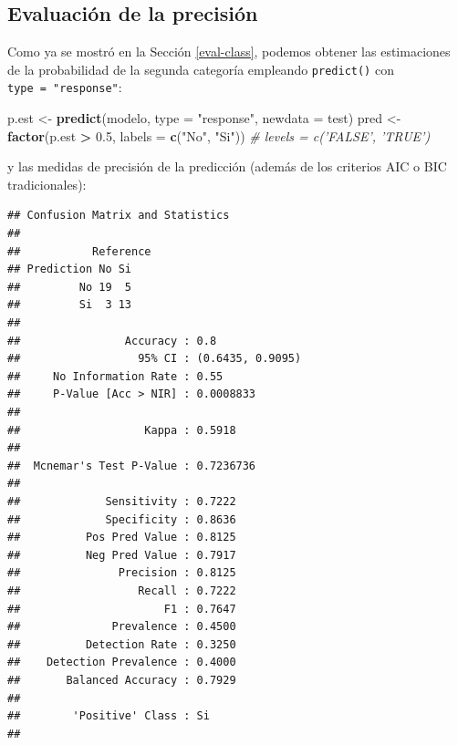 \documentclass[
  spanish,
]{book}
\newenvironment{Shaded}{\begin{snugshade}}{\end{snugshade}}
\newcommand{\CommentTok}[1]{\textcolor[rgb]{0.56,0.35,0.01}{\textit{#1}}}
\newcommand{\DataTypeTok}[1]{\textcolor[rgb]{0.13,0.29,0.53}{#1}}
\newcommand{\FloatTok}[1]{\textcolor[rgb]{0.00,0.00,0.81}{#1}}
\newcommand{\KeywordTok}[1]{\textcolor[rgb]{0.13,0.29,0.53}{\textbf{#1}}}
\newcommand{\NormalTok}[1]{#1}
\newcommand{\OperatorTok}[1]{\textcolor[rgb]{0.81,0.36,0.00}{\textbf{#1}}}
\newcommand{\StringTok}[1]{\textcolor[rgb]{0.31,0.60,0.02}{#1}}
\theoremstyle{break}
\theoremstyle{definition}
\theoremstyle{definition}
\theoremstyle{definition}
\theoremstyle{remark}
\begin{document}
\hypertarget{evaluaciuxf3n-de-la-precisiuxf3n-1}{%
\subsection{Evaluación de la precisión}\label{evaluaciuxf3n-de-la-precisiuxf3n-1}}

Como ya se mostró en la Sección \ref{eval-class}, podemos obtener las estimaciones de la probabilidad de la segunda categoría empleando \texttt{predict()} con \texttt{type\ =\ "response"}:

\begin{Shaded}
\begin{Highlighting}[]
\NormalTok{p.est <-}\StringTok{ }\KeywordTok{predict}\NormalTok{(modelo, }\DataTypeTok{type =} \StringTok{"response"}\NormalTok{, }\DataTypeTok{newdata =}\NormalTok{ test)}
\NormalTok{pred <-}\StringTok{ }\KeywordTok{factor}\NormalTok{(p.est }\OperatorTok{>}\StringTok{ }\FloatTok{0.5}\NormalTok{, }\DataTypeTok{labels =} \KeywordTok{c}\NormalTok{(}\StringTok{"No"}\NormalTok{, }\StringTok{"Si"}\NormalTok{)) }\CommentTok{# levels = c('FALSE', 'TRUE')}
\end{Highlighting}
\end{Shaded}

y las medidas de precisión de la predicción (además de los criterios AIC o BIC tradicionales):

\begin{Shaded}
\end{Shaded}

\begin{verbatim}
## Confusion Matrix and Statistics
## 
##           Reference
## Prediction No Si
##         No 19  5
##         Si  3 13
##                                           
##                Accuracy : 0.8             
##                  95% CI : (0.6435, 0.9095)
##     No Information Rate : 0.55            
##     P-Value [Acc > NIR] : 0.0008833       
##                                           
##                   Kappa : 0.5918          
##                                           
##  Mcnemar's Test P-Value : 0.7236736       
##                                           
##             Sensitivity : 0.7222          
##             Specificity : 0.8636          
##          Pos Pred Value : 0.8125          
##          Neg Pred Value : 0.7917          
##               Precision : 0.8125          
##                  Recall : 0.7222          
##                      F1 : 0.7647          
##              Prevalence : 0.4500          
##          Detection Rate : 0.3250          
##    Detection Prevalence : 0.4000          
##       Balanced Accuracy : 0.7929          
##                                           
##        'Positive' Class : Si              
## 
\end{verbatim}
\end{document}
